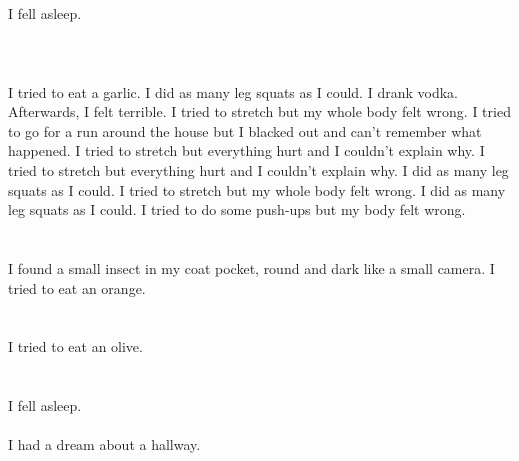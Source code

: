 \documentclass{article}
\begin{document}
    \section{}
    I fell asleep.\\\\ 
    \newpage
    
    \section{}
    I tried to eat a garlic. I did as many leg squats as I could. I drank vodka. Afterwards, I felt terrible.  I tried to stretch but my whole body felt wrong.  I tried to go for a run around the house but I blacked out and can't remember what happened.  I tried to stretch but everything hurt and I couldn't explain why.  I tried to stretch but everything hurt and I couldn't explain why.   I did as many leg squats as I could.  I tried to stretch but my whole body felt wrong.  I did as many leg squats as I could.  I tried to do some push-ups but my body felt wrong.  
    \newpage
    
    \section{}
    I found a small insect in my coat pocket, round and dark like a small camera. I tried to eat an orange.  
    \newpage
    
    \section{}
    I tried to eat an olive.  
    \newpage
    
    \section{}
    I fell asleep.\\\\I had a dream about a hallway.\\\\ 
    \newpage
    
\end{document}
